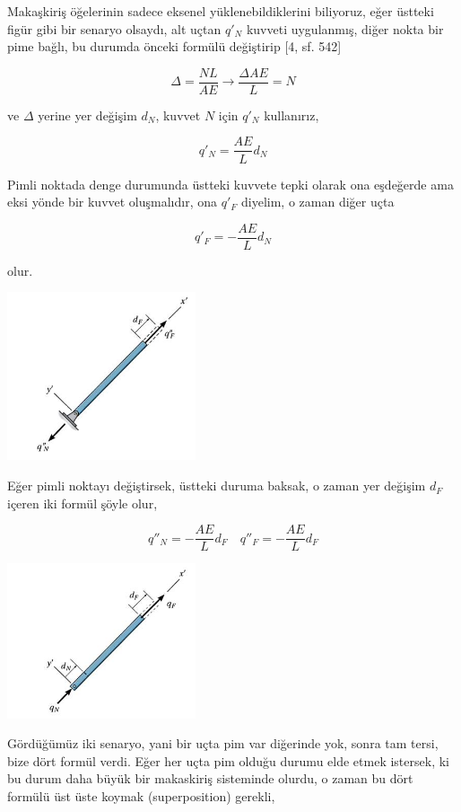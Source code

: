 \documentclass[12pt,fleqn]{article}\usepackage{../../common}
\begin{document}
Makaşkiriş öğelerinin sadece eksenel yüklenebildiklerini biliyoruz, eğer üstteki
figür gibi bir senaryo olsaydı, alt uçtan $q'_N$ kuvveti uygulanmış, diğer nokta
bir pime bağlı, bu durumda önceki formülü değiştirip [4, sf. 542]

$$
\Delta = \frac{NL}{AE} \to \frac{\Delta AE}{L} = N
$$

ve $\Delta$ yerine yer değişim $d_N$, kuvvet $N$ için $q'_N$ kullanırız,

$$
q'_N = \frac{AE}{L} d_N
$$

Pimli noktada denge durumunda üstteki kuvvete tepki olarak ona eşdeğerde ama
eksi yönde bir kuvvet oluşmalıdır, ona $q'_F$ diyelim, o zaman diğer uçta

$$
q'_F = -\frac{AE}{L} d_N
$$

olur.

\includegraphics[width=15em]{phy_020_strs_05_07.jpg}

Eğer pimli noktayı değiştirsek, üstteki duruma baksak, o zaman yer değişim
$d_F$ içeren iki formül şöyle olur,

$$
q''_N = - \frac{AE}{L} d_F \quad
q''_F = - \frac{AE}{L} d_F 
$$

\includegraphics[width=15em]{phy_020_strs_05_08.jpg}

Gördüğümüz iki senaryo, yani bir uçta pim var diğerinde yok, sonra tam tersi,
bize dört formül verdi. Eğer her uçta pim olduğu durumu elde etmek istersek, ki
bu durum daha büyük bir makaskiriş sisteminde olurdu, o zaman bu dört formülü
üst üste koymak (superposition) gerekli,
\end{document}
